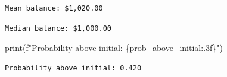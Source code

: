 \documentclass[
  letterpaper,
  DIV=11,
  numbers=noendperiod]{scrartcl}
\newenvironment{Shaded}{\begin{snugshade}}{\end{snugshade}}
\newcommand{\BuiltInTok}[1]{\textcolor[rgb]{0.00,0.23,0.31}{#1}}
\newcommand{\NormalTok}[1]{\textcolor[rgb]{0.00,0.23,0.31}{#1}}
\newcommand{\SpecialCharTok}[1]{\textcolor[rgb]{0.37,0.37,0.37}{#1}}
\newcommand{\SpecialStringTok}[1]{\textcolor[rgb]{0.13,0.47,0.30}{#1}}
\theoremstyle{definition}
\theoremstyle{remark}
\begin{document}
\begin{verbatim}
Mean balance: $1,020.00
\end{verbatim}

\begin{Shaded}
\end{Shaded}

\begin{verbatim}
Median balance: $1,000.00
\end{verbatim}

\begin{Shaded}
\begin{Highlighting}[]
\BuiltInTok{print}\NormalTok{(}\SpecialStringTok{f"Probability above initial: }\SpecialCharTok{\{}\NormalTok{prob\_above\_initial}\SpecialCharTok{:.3f\}}\SpecialStringTok{"}\NormalTok{)}
\end{Highlighting}
\end{Shaded}

\begin{verbatim}
Probability above initial: 0.420
\end{verbatim}
\end{document}
